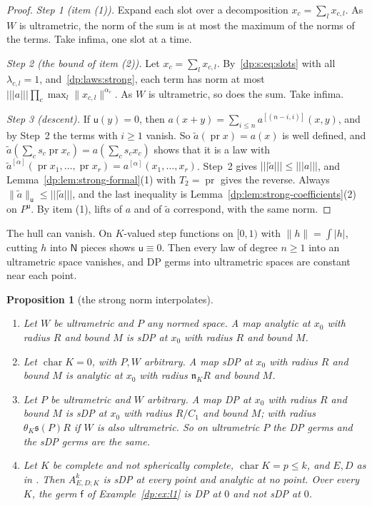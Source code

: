 \documentclass[11pt]{amsart}
\newtheorem{proposition}[theorem]{Proposition}
\theoremstyle{definition}
\theoremstyle{remark}
\numberwithin{equation}{section}
\newcommand{\abs}[1]{\lvert #1\rvert}
\newcommand{\norm}[1]{\lVert #1\rVert}
\theoremstyle{plain}
\theoremstyle{definition}
\theoremstyle{plain}
\begin{document}
\begin{proof}
\emph{Step 1 (item (1)).} Expand each slot over a decomposition $x_c=\sum_lx_{c,l}$. As $W$ is ultrametric, the norm of the sum is at most the maximum of the norms of the terms. Take infima, one slot at a time.

\emph{Step 2 (the bound of item (2)).} Let $x_c=\sum_lx_{c,l}$. By~\eqref{dp:s:eq:slots} with all $\lambda_{c,l}=1$, and~\eqref{dp:laws:strong}, each term has norm at most $\lvert\!\lvert\!\lvert a\rvert\!\rvert\!\rvert\prod_c\max_l\norm{x_{c,l}}^{\alpha_c}$. As $W$ is ultrametric, so does the sum. Take infima.

\emph{Step 3 (descent).} If $\mathsf u(y)=0$, then $a(x+y)=\sum_{i\le n}a^{[(n-i,i)]}(x,y)$, and by Step~2 the terms with $i\ge1$ vanish. So $\tilde a(\operatorname{pr}x)=a(x)$ is well defined, and $\tilde a(\sum_cs_c\operatorname{pr}x_c)=a(\sum_cs_cx_c)$ shows that it is a law with $\tilde a^{[\alpha]}(\operatorname{pr}x_1,\dots,\operatorname{pr}x_r)=a^{[\alpha]}(x_1,\dots,x_r)$. Step~2 gives $\lvert\!\lvert\!\lvert \tilde a\rvert\!\rvert\!\rvert\le\lvert\!\lvert\!\lvert a\rvert\!\rvert\!\rvert$, and Lemma~\ref{dp:lem:strong-formal}(1) with $T_2=\operatorname{pr}$ gives the reverse. Always $\norm{\tilde a}_{\mathsf u}\le\lvert\!\lvert\!\lvert \tilde a\rvert\!\rvert\!\rvert$, and the last inequality is Lemma~\ref{dp:lem:strong-coefficients}(2) on $P^{\mathsf u}$. By item (1), lifts of $a$ and of $\tilde a$ correspond, with the same norm.
\end{proof}

The hull can vanish. On $K$-valued step functions on $[0,1)$ with $\norm h=\int\abs h$, cutting $h$ into $\mathsf N$ pieces shows $\mathsf u\equiv0$. Then every law of degree $n\ge1$ into an ultrametric space vanishes, and DP germs into ultrametric spaces are constant near each point.

\begin{proposition}[the strong norm interpolates]\label{dp:prop:strong-interpolates}
\leavevmode
\begin{enumerate}
\item Let $W$ be ultrametric and $P$ any normed space. A map analytic at $x_0$ with radius $R$ and bound $M$ is sDP at $x_0$ with radius $R$ and bound $M$.
\item Let $\operatorname{char}K=0$, with $P,W$ arbitrary. A map sDP at $x_0$ with radius $R$ and bound $M$ is analytic at $x_0$ with radius $\mathfrak n_KR$ and bound $M$.
\item Let $P$ be ultrametric and $W$ arbitrary. A map DP at $x_0$ with radius $R$ and bound $M$ is sDP at $x_0$ with radius $R/C_1$ and bound $M$; with radius $\theta_K\mathfrak s(P)R$ if $W$ is also ultrametric. So on ultrametric $P$ the DP germs and the sDP germs are the same.
\item Let $K$ be complete and not spherically complete, $\operatorname{char}K=p\le k$, and $E,D$ as in \cite[Theorem~7.2(2)]{I}. Then $A^k_{E,D;K}$ is sDP at every point and analytic at no point. Over every $K$, the germ $\mathsf f$ of Example~\ref{dp:ex:l1} is DP at $0$ and not sDP at $0$.
\end{enumerate}
\end{proposition}
\end{document}
